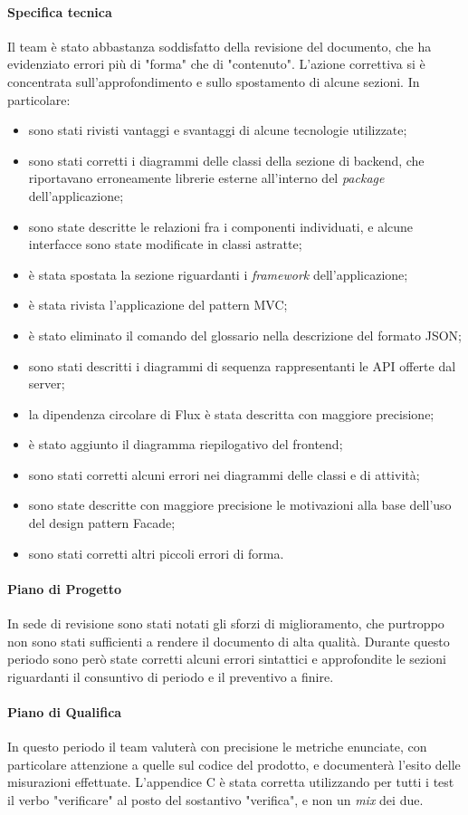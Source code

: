 \paragraph*{Specifica tecnica}
Il team è stato abbastanza soddisfatto della revisione del documento, che ha evidenziato errori più di "forma" che di "contenuto". L'azione correttiva si è concentrata sull'approfondimento e sullo spostamento di alcune sezioni. In particolare:
\begin{itemize}
\item sono stati rivisti vantaggi e svantaggi di alcune tecnologie utilizzate;
\item sono stati corretti i diagrammi delle classi della sezione di backend, che riportavano erroneamente librerie esterne all'interno del \textit{package} dell'applicazione;
\item sono state descritte le relazioni fra i componenti individuati, e alcune interfacce sono state modificate in classi astratte;
\item è stata spostata la sezione riguardanti i \textit{framework} dell'applicazione;
\item è stata rivista l'applicazione del pattern MVC;
\item è stato eliminato il comando del glossario nella descrizione del formato JSON;
\item sono stati descritti i diagrammi di sequenza rappresentanti le API offerte dal server;
\item la dipendenza circolare di Flux è stata descritta con maggiore precisione;
\item è stato aggiunto il diagramma riepilogativo del frontend;
\item sono stati corretti alcuni errori nei diagrammi delle classi e di attività;
\item sono state descritte con maggiore precisione le motivazioni alla base dell'uso del design pattern Facade;
\item sono stati corretti altri piccoli errori di forma.
\end{itemize}

\paragraph*{Piano di Progetto}
In sede di revisione sono stati notati gli sforzi di miglioramento, che purtroppo non sono stati sufficienti a rendere il documento di alta qualità. Durante questo periodo sono però state corretti alcuni errori sintattici e approfondite le sezioni riguardanti il consuntivo di periodo e il preventivo a finire.

\paragraph*{Piano di Qualifica}
In questo periodo il team valuterà con precisione le metriche enunciate, con particolare attenzione a quelle sul codice del prodotto, e documenterà l'esito delle misurazioni effettuate. L'appendice C è stata corretta utilizzando per tutti i test il verbo "verificare" al posto del sostantivo "verifica", e non un \textit{mix} dei due.
